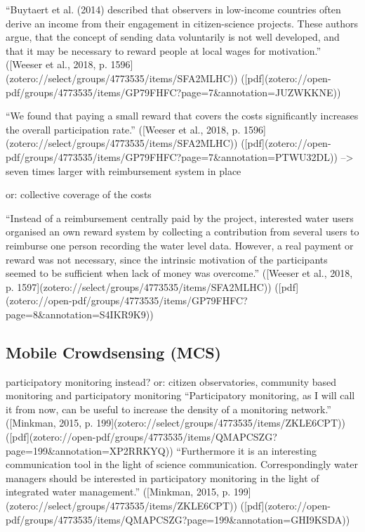 {“Buytaert et al. (2014) described that observers in low-income countries often derive an income from their engagement in citizen-science projects. These authors argue, that the concept of sending data voluntarily is not well developed, and that it may be necessary to reward people at local wages for motivation.” ([Weeser et al., 2018, p. 1596](zotero://select/groups/4773535/items/SFA2MLHC)) ([pdf](zotero://open-pdf/groups/4773535/items/GP79FHFC?page=7&annotation=JUZWKKNE))

“We found that paying a small reward that covers the costs significantly increases the overall participation rate.” ([Weeser et al., 2018, p. 1596](zotero://select/groups/4773535/items/SFA2MLHC)) ([pdf](zotero://open-pdf/groups/4773535/items/GP79FHFC?page=7&annotation=PTWU32DL))
--> seven times larger with reimbursement system in place


or: collective coverage of the costs

“Instead of a reimbursement centrally paid by the project, interested water users organised an own reward system by collecting a contribution from several users to reimburse one person recording the water level data. However, a real payment or reward was not necessary, since the intrinsic motivation of the participants seemed to be sufficient when lack of money was overcome.” ([Weeser et al., 2018, p. 1597](zotero://select/groups/4773535/items/SFA2MLHC)) ([pdf](zotero://open-pdf/groups/4773535/items/GP79FHFC?page=8&annotation=S4IKR9K9))



\subsection{Mobile Crowdsensing (MCS)}

participatory monitoring instead? or: citizen observatories, community based monitoring and participatory monitoring
“Participatory monitoring, as I will call it from now, can be useful to increase the density of a monitoring network.” ([Minkman, 2015, p. 199](zotero://select/groups/4773535/items/ZKLE6CPT)) ([pdf](zotero://open-pdf/groups/4773535/items/QMAPCSZG?page=199&annotation=XP2RRKYQ))
“Furthermore it is an interesting communication tool in the light of science communication. Correspondingly water managers should be interested in participatory monitoring in the light of integrated water management.” ([Minkman, 2015, p. 199](zotero://select/groups/4773535/items/ZKLE6CPT)) ([pdf](zotero://open-pdf/groups/4773535/items/QMAPCSZG?page=199&annotation=GHI9KSDA))


}
